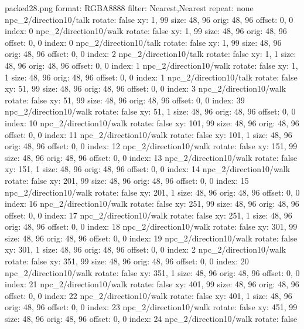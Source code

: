 packed28.png
format: RGBA8888
filter: Nearest,Nearest
repeat: none
npc_2/direction10/talk
  rotate: false
  xy: 1, 99
  size: 48, 96
  orig: 48, 96
  offset: 0, 0
  index: 0
npc_2/direction10/walk
  rotate: false
  xy: 1, 99
  size: 48, 96
  orig: 48, 96
  offset: 0, 0
  index: 0
npc_2/direction10/talk
  rotate: false
  xy: 1, 99
  size: 48, 96
  orig: 48, 96
  offset: 0, 0
  index: 2
npc_2/direction10/talk
  rotate: false
  xy: 1, 1
  size: 48, 96
  orig: 48, 96
  offset: 0, 0
  index: 1
npc_2/direction10/walk
  rotate: false
  xy: 1, 1
  size: 48, 96
  orig: 48, 96
  offset: 0, 0
  index: 1
npc_2/direction10/talk
  rotate: false
  xy: 51, 99
  size: 48, 96
  orig: 48, 96
  offset: 0, 0
  index: 3
npc_2/direction10/walk
  rotate: false
  xy: 51, 99
  size: 48, 96
  orig: 48, 96
  offset: 0, 0
  index: 39
npc_2/direction10/walk
  rotate: false
  xy: 51, 1
  size: 48, 96
  orig: 48, 96
  offset: 0, 0
  index: 10
npc_2/direction10/walk
  rotate: false
  xy: 101, 99
  size: 48, 96
  orig: 48, 96
  offset: 0, 0
  index: 11
npc_2/direction10/walk
  rotate: false
  xy: 101, 1
  size: 48, 96
  orig: 48, 96
  offset: 0, 0
  index: 12
npc_2/direction10/walk
  rotate: false
  xy: 151, 99
  size: 48, 96
  orig: 48, 96
  offset: 0, 0
  index: 13
npc_2/direction10/walk
  rotate: false
  xy: 151, 1
  size: 48, 96
  orig: 48, 96
  offset: 0, 0
  index: 14
npc_2/direction10/walk
  rotate: false
  xy: 201, 99
  size: 48, 96
  orig: 48, 96
  offset: 0, 0
  index: 15
npc_2/direction10/walk
  rotate: false
  xy: 201, 1
  size: 48, 96
  orig: 48, 96
  offset: 0, 0
  index: 16
npc_2/direction10/walk
  rotate: false
  xy: 251, 99
  size: 48, 96
  orig: 48, 96
  offset: 0, 0
  index: 17
npc_2/direction10/walk
  rotate: false
  xy: 251, 1
  size: 48, 96
  orig: 48, 96
  offset: 0, 0
  index: 18
npc_2/direction10/walk
  rotate: false
  xy: 301, 99
  size: 48, 96
  orig: 48, 96
  offset: 0, 0
  index: 19
npc_2/direction10/walk
  rotate: false
  xy: 301, 1
  size: 48, 96
  orig: 48, 96
  offset: 0, 0
  index: 2
npc_2/direction10/walk
  rotate: false
  xy: 351, 99
  size: 48, 96
  orig: 48, 96
  offset: 0, 0
  index: 20
npc_2/direction10/walk
  rotate: false
  xy: 351, 1
  size: 48, 96
  orig: 48, 96
  offset: 0, 0
  index: 21
npc_2/direction10/walk
  rotate: false
  xy: 401, 99
  size: 48, 96
  orig: 48, 96
  offset: 0, 0
  index: 22
npc_2/direction10/walk
  rotate: false
  xy: 401, 1
  size: 48, 96
  orig: 48, 96
  offset: 0, 0
  index: 23
npc_2/direction10/walk
  rotate: false
  xy: 451, 99
  size: 48, 96
  orig: 48, 96
  offset: 0, 0
  index: 24
npc_2/direction10/walk
  rotate: false
